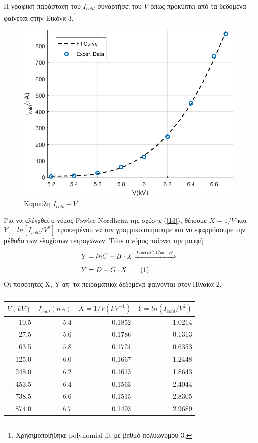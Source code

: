 \documentclass[a4paper]{article}
\newcommand\numberthis{\addtocounter{equation}{1}\tag{\theequation}}
\begin{document}
Η γραφική παράσταση του $I_{cold}$ συναρτήσει του $V$ όπως προκύπτει από τα δεδομένα φαίνεται στην Εικόνα 3.\footnote{Χρησιμοποιήθηκε polynomial fit με βαθμό πολυωνύμου 3.}
\begin{figure}[h!]
\centering 
\caption{Καμπύλη $I_{cold}-V$ }
\includegraphics[scale=0.6]{IcoldV.png}
\end{figure}

Για να ελέγχθεί ο νόμος Fowler-Nordheim της σχέσης (\ref{13}), θέτουμε $X=1/V$ και $Y=ln\left[ I_{cold}/V^2\right]$ προκειμένου να τον γραμμικοποιήσουμε και να εφαρμόσουμε την μέθοδο των ελαχίστων τετραγώνων. Τότε ο νόμος παίρνει την μορφή 
\begin{align*}
Y&=lnC-B\cdot X \xRightarrow{D=lnC,G=-B	}\\ 
Y&=D+G\cdot X 				\numberthis
\end{align*}
Οι ποσότητες X, Y απ' τα πειραματικά δεδομένα φαίνονται στον Πίνακα 2. 
\begin{table}[h!]
\centering 
\caption{ }
\begin{tabular}{r|r|r|r}
$V(kV)$ & $I_{cold} (nA)$ & $X=1/V(kV^{-1})$ & $Y=ln(I_{cold}/V^2)$ \\ 
\hline\hline
10.5&  5.4&  0.1852&-1.0214 \\
27.5&  5.6&  0.1786&-0.1313\\
63.5&  5.8&  0.1724& 0.6353\\
  125.0&  6.0&  0.1667& 1.2448\\
  248.0&  6.2&  0.1613& 1.8643\\
  453.5&  6.4&  0.1563& 2.4044\\
  738.5&  6.6&  0.1515& 2.8305\\
  874.0&  6.7&  0.1493& 2.9689\\
\end{tabular}
\end{table}
 
\end{document}
